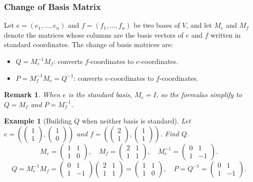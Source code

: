 \documentclass{article}
\newtheorem*{example}{Example}
\newtheorem{remark}{Remark}
\begin{document}
\subsubsection{Change of Basis Matrix}
Let $e=(e_1,\ldots,e_n)$ and $f=(f_1,\ldots,f_n)$ be two bases of $V$, and let $M_e$ and $M_f$ denote the matrices whose columns are the basis vectors of $e$ and $f$ written in standard coordinates. The change of basis matrices are:
\begin{itemize}
    \item $Q = M_e^{-1}M_f$: converts $f$-coordinates to $e$-coordinates.
    \item $P = M_f^{-1}M_e = Q^{-1}$: converts $e$-coordinates to $f$-coordinates.
\end{itemize}
\begin{remark}
    When $e$ is the standard basis, $M_e = I$, so the formulas simplify to $Q = M_f$ and $P = M_f^{-1}$.
\end{remark}
\begin{example}[Building $Q$ when neither basis is standard]
    Let $e=\left(\begin{pmatrix}1\\1\end{pmatrix},\begin{pmatrix}1\\0\end{pmatrix}\right)$ and $f=\left(\begin{pmatrix}2\\1\end{pmatrix},\begin{pmatrix}1\\1\end{pmatrix}\right)$. Find $Q$.
    \[M_e = \begin{pmatrix}1&1\\1&0\end{pmatrix}, \quad M_f = \begin{pmatrix}2&1\\1&1\end{pmatrix}, \quad M_e^{-1} = \begin{pmatrix}0&1\\1&-1\end{pmatrix}.\]
    \[Q = M_e^{-1}M_f = \begin{pmatrix}0&1\\1&-1\end{pmatrix}\begin{pmatrix}2&1\\1&1\end{pmatrix} = \begin{pmatrix}1&1\\1&0\end{pmatrix}, \quad P = Q^{-1} = \begin{pmatrix}0&1\\1&-1\end{pmatrix}.\]
\end{example}
\end{document}
